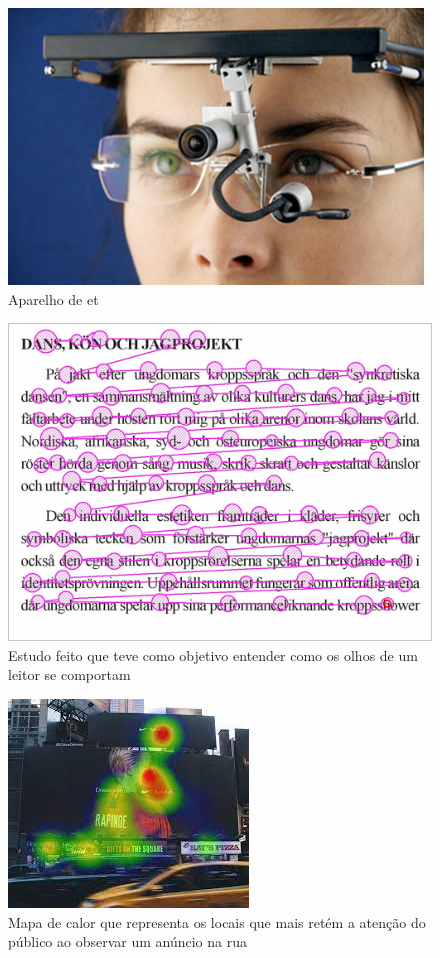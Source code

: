 \documentclass{report}
\begin{document}
\begin{figure}
    \centering
    \includegraphics[width=0.75\linewidth]{20170731-eye-6.2.png}
    \caption{Aparelho de \ac{et}}
    \label{fig:3.1}
\end{figure}

\begin{figure}
    \centering
    \includegraphics[width=0.75\linewidth]{Reading_Fixations_Saccades.jpg}
    \caption{Estudo feito que teve como objetivo entender como os olhos de um leitor se comportam}
    \label{fig:3.2}
\end{figure}

\begin{figure}
    \centering
    \includegraphics[width=0.75\linewidth]{download.jpeg}
    \caption{Mapa de calor que representa os locais que mais retém a atenção do público ao observar um anúncio na rua}
    \label{fig:3.3}
\end{figure}
\end{document}
